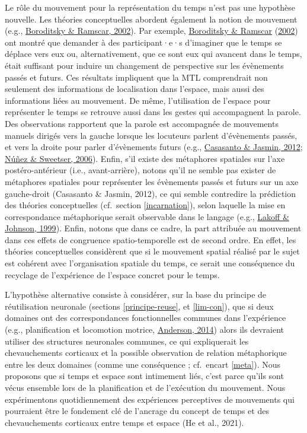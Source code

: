\documentclass[
  a4paper,12pt,twoside,onecolumn,openright,final,oldfontcommands]{memoir}
\begin{document}
Le rôle du mouvement pour la représentation du temps n'est pas une hypothèse nouvelle. Les théories conceptuelles abordent également la notion de mouvement (e.g., \protect\hyperlink{ref-boroditsky_roles_2002}{Boroditsky \& Ramscar, 2002}). Par exemple, \protect\hyperlink{ref-boroditsky_roles_2002}{Boroditsky \& Ramscar} (\protect\hyperlink{ref-boroditsky_roles_2002}{2002}) ont montré que demander à des participant·e·s d'imaginer que le temps se déplace vers eux ou, alternativement, que ce sont eux qui avancent dans le temps, était suffisant pour induire un changement de perspective sur les évènements passés et futurs. Ces résultats impliquent que la MTL comprendrait non seulement des informations de localisation dans l'espace, mais aussi des informations liées au mouvement. De même, l'utilisation de l'espace pour représenter le temps se retrouve aussi dans les gestes qui accompagnent la parole. Des observations rapportent que la parole est accompagnée de mouvements manuels dirigés vers la gauche lorsque les locuteurs parlent d'évènements passés, et vers la droite pour parler d'évènements futurs (e.g., \protect\hyperlink{ref-casasanto_hands_2012}{Casasanto \& Jasmin, 2012}; \protect\hyperlink{ref-nunez_future_2006}{Núñez \& Sweetser, 2006}). Enfin, s'il existe des métaphores spatiales sur l'axe postéro-antérieur (i.e., avant-arrière), notons qu'il ne semble pas exister de métaphores spatiales pour représenter les évènements passés et futurs sur un axe gauche-droit (Casasanto \& Jasmin, 2012), ce qui semble contredire la prédiction des théories conceptuelles (cf.~section \ref{incarnation}), selon laquelle la mise en correspondance métaphorique serait observable dans le langage (e.g., \protect\hyperlink{ref-lakoff_philosophy_1999}{Lakoff \& Johnson, 1999}). Enfin, notons que dans ce cadre, la part attribuée au mouvement dans ces effets de congruence spatio-temporelle est de second ordre. En effet, les théories conceptuelles considèrent que si le mouvement spatial réalisé par le sujet est cohérent avec l'organisation spatiale du temps, ce serait une conséquence du recyclage de l'expérience de l'espace concret pour le temps.

L'hypothèse alternative consiste à considérer, sur la base du principe de réutilisation neuronale (sections \ref{principe-reuse}, et \ref{lim-con}), que si deux domaines ont des correspondances fonctionnelles communes dans l'expérience (e.g., planification et locomotion motrice, \protect\hyperlink{ref-anderson_after_2014}{Anderson, 2014}) alors ils devraient utiliser des structures neuronales communes, ce qui expliquerait les chevauchements corticaux et la possible observation de relation métaphorique entre les deux domaines (comme une conséquence ; cf.~encart \ref{meta}). Nous proposons que si temps et espace sont intimement liés, c'est parce qu'ils sont vécus ensemble lors de la planification et de l'exécution du mouvement. Nous expérimentons quotidiennement des expériences perceptives de mouvements qui pourraient être le fondement clé de l'ancrage du concept de temps et des chevauchements corticaux entre temps et espace (He et al., 2021).
\end{document}
